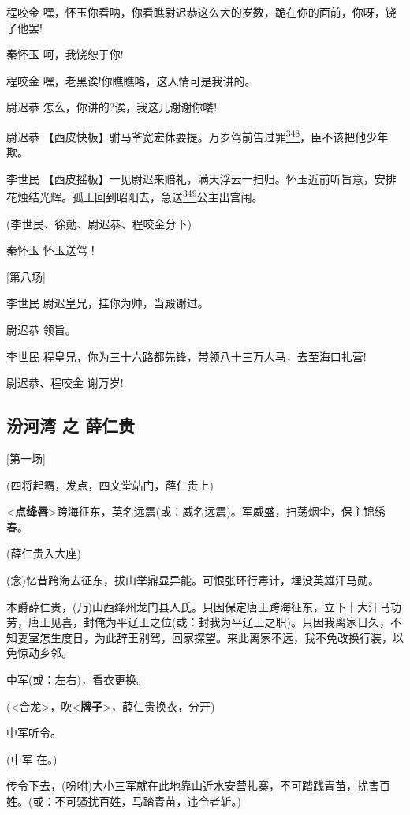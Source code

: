 程咬金
嘿，怀玉你看呐，你看瞧尉迟恭这么大的岁数，跪在你的面前，你呀，饶了他罢!

秦怀玉 呵，我饶恕于你!

程咬金 嘿，老黑诶!你瞧瞧咯，这人情可是我讲的。

尉迟恭 怎么，你讲的?诶，我这儿谢谢你喽!

尉迟恭
【西皮快板】驸马爷宽宏休要提。万岁驾前告过罪\protect\hyperlink{fn348}{\textsuperscript{348}}，臣不该把他少年欺。

李世民
【西皮摇板】一见尉迟来赔礼，满天浮云一扫归。怀玉近前听旨意，安排花烛结光辉。孤王回到昭阳去，急送\protect\hyperlink{fn349}{\textsuperscript{349}}公主出宫闱。

(李世民、徐勣、尉迟恭、程咬金分下)

秦怀玉 怀玉送驾！

{[}第八场{]}

李世民 尉迟皇兄，挂你为帅，当殿谢过。

尉迟恭 领旨。

李世民 程皇兄，你为三十六路都先锋，带领八十三万人马，去至海口扎营!

尉迟恭、程咬金 谢万岁!

\newpage
\hypertarget{ux6c7eux6cb3ux6e7e-ux4e4b-ux859bux4ec1ux8d35}{%
\subsection{汾河湾 之
薛仁贵}\label{ux6c7eux6cb3ux6e7e-ux4e4b-ux859bux4ec1ux8d35}}

{[}第一场{]}

(四将起霸，发点，四文堂站门，薛仁贵上)

\textless{}\textbf{点绛唇}\textgreater{}跨海征东，英名远震(或：威名远震)。军威盛，扫荡烟尘，保主锦绣春。

(薛仁贵入大座)

(念)忆昔跨海去征东，拔山举鼎显异能。可恨张环行毒计，埋没英雄汗马勋。

本爵薛仁贵，(乃)山西绛州龙门县人氏。只因保定唐王跨海征东，立下十大汗马功劳，唐王见喜，封俺为平辽王之位(或：封我为平辽王之职)。只因我离家日久，不知妻室怎生度日，为此辞王别驾，回家探望。来此离家不远，我不免改换行装，以免惊动乡邻。

中军(或：左右)，看衣更换。

(\textless{}合龙\textgreater{}，吹\textless{}\textbf{牌子}\textgreater{}，薛仁贵换衣，分开)

中军听令。

(中军 在。)

传令下去，(吩咐)大小三军就在此地靠山近水安营扎寨，不可踏践青苗，扰害百姓。(或：不可骚扰百姓，马踏青苗，违令者斩。)

